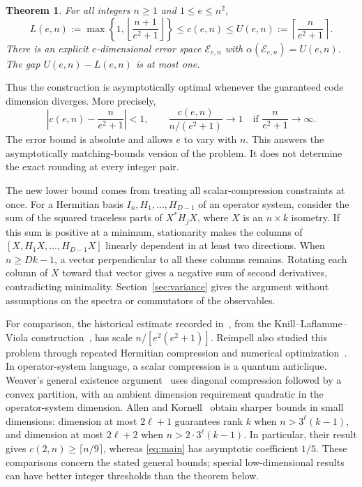 \documentclass[11pt]{article}
\newcommand{\E}{\mathcal E}
\newtheorem{theorem}{Theorem}[section]
\theoremstyle{remark}
\numberwithin{equation}{section}
\begin{document}
\begin{theorem}\label{thm:main}
For all integers $n\ge1$ and $1\le e\le n^2$,
\begin{equation}\label{eq:main}
 L(e,n):=\max\!\left\{1,\left\lfloor\frac{n+1}{e^2+1}\right\rfloor\right\}
 \le c(e,n)\le
 U(e,n):=\left\lceil\frac{n}{e^2+1}\right\rceil.
\end{equation}
There is an explicit $e$-dimensional error space $\E_{e,n}$ with
$\alpha(\E_{e,n})=U(e,n)$. The gap $U(e,n)-L(e,n)$ is at most one.
\end{theorem}

Thus the construction is asymptotically optimal whenever the guaranteed
code dimension diverges. More precisely,
\begin{equation}\label{eq:asymptotic}
 \left|c(e,n)-\frac{n}{e^2+1}\right|<1,
 \qquad
 \frac{c(e,n)}{n/(e^2+1)}\longrightarrow1
 \quad\text{if }\frac{n}{e^2+1}\longrightarrow\infty.
\end{equation}
The error bound is absolute and allows $e$ to vary with $n$. This answers
the asymptotically matching-bounds version of the problem. It does not
determine the exact rounding at every integer pair.

The new lower bound comes from treating all scalar-compression constraints
at once. For a Hermitian basis $I_n,H_1,\ldots,H_{D-1}$ of an operator
system, consider the sum of the squared traceless parts of
$X^*H_jX$, where $X$ is an $n\times k$ isometry. If this sum is positive
at a minimum, stationarity makes the columns of
$[X,H_1X,\ldots,H_{D-1}X]$ linearly dependent in at least two directions.
When $n\ge Dk-1$, a vector perpendicular to all these columns remains.
Rotating each column of $X$ toward that vector gives a negative sum of
second derivatives, contradicting minimality. Section~\ref{sec:variance}
gives the argument without assumptions on the spectra or commutators of
the observables.

For comparison, the historical estimate recorded in~\cite{KW05}, from
the Knill--Laflamme--Viola construction~\cite{KLV00}, has scale
$n/[e^2(e^2+1)]$. Reimpell also studied this problem through repeated
Hermitian compression and numerical optimization~\cite[Section~3.3.4]{Reimpell}.
In operator-system language, a scalar compression is a quantum anticlique.
Weaver's general existence argument~\cite[Theorem~2.10]{Weaver} uses
diagonal compression followed by a convex partition, with an ambient
dimension requirement quadratic in the operator-system dimension.
Allen and Kornell~\cite[Theorem~2.7]{AK} obtain sharper bounds in small
dimensions: dimension at most $2\ell+1$ guarantees rank $k$ when
$n>3^\ell(k-1)$, and dimension at most $2\ell+2$ when
$n>2\cdot3^\ell(k-1)$. In particular, their result gives
$c(2,n)\ge\lceil n/9\rceil$, whereas \eqref{eq:main} has asymptotic
coefficient $1/5$. These comparisons concern the stated general bounds;
special low-dimensional results can have better integer thresholds than
the theorem below.
\end{document}
